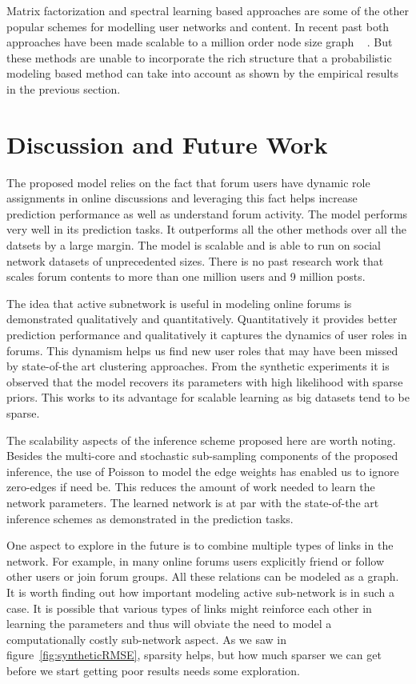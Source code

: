 \documentclass{sig-alternate}
\begin{document}
Matrix factorization and spectral learning based approaches are some of the
other popular schemes for modelling user networks and content. In recent
past both approaches have been made scalable to a million order node size graph
~ \cite{Gemulla:2011:LMF,Dhillon:2005}. But these methods are unable to incorporate 
the rich structure that a probabilistic modeling based method 
can take into account as shown by the empirical results in the 
previous section.



\section{Discussion and Future Work}
The  proposed model relies on the fact that forum users have dynamic role
assignments in online discussions and leveraging this fact helps increase
prediction performance as well as understand forum activity. The model
performs very well in its prediction tasks. It outperforms all the other methods
over all the datsets by a large margin. The model is scalable and is able to run
on social network datasets of unprecedented sizes. There is no past
research work that scales forum contents to more than one million users 
and 9 million posts. 

The idea that active subnetwork is useful in modeling online forums is
demonstrated qualitatively and quantitatively. Quantitatively it provides better
prediction performance and qualitatively it captures the dynamics of user
roles in forums. This dynamism helps us find new user roles that may have
been missed by state-of-the art clustering approaches.
From the synthetic experiments it is observed that the model
recovers its parameters with high likelihood with sparse priors. This works to
its advantage for scalable learning as big datasets tend to be sparse.

The scalability aspects of the inference scheme proposed here are worth noting.
Besides the multi-core and stochastic sub-sampling components of the proposed
inference, the use of Poisson to model the edge weights has enabled us to 
ignore zero-edges if need be. This reduces the amount of work needed to
learn the network parameters. The learned network is at par with the state-of-the art
inference schemes as demonstrated in the prediction tasks.   

One aspect to explore in the future is to combine multiple types of links in the
network. For example, in many online forums users explicitly friend or
follow other users or join forum groups. 
All these relations can be modeled as a graph. It is worth finding out
how important modeling active sub-network is in such a case. It is
possible that various types of links might reinforce each other in learning
the parameters and thus will obviate the need to model a computationally
costly sub-network aspect. As we saw in figure~\ref{fig:syntheticRMSE}, 
sparsity helps, but how much sparser we can get before we start getting poor results
needs some exploration.
\end{document}

